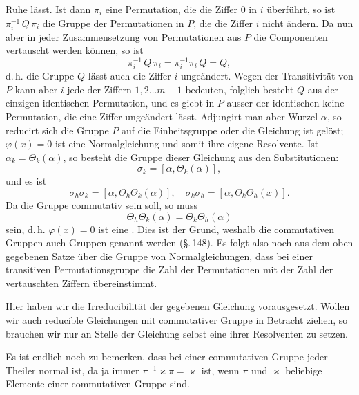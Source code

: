 Ruhe lässt. Ist dann $\pi_i$ eine Permutation, die die Ziffer 0 in $i$ überführt, so ist $\pi_i^{-1}\,Q\,\pi_i$ die Gruppe der Permutationen in $P$, die die Ziffer $i$ nicht ändern. Da nun aber in jeder Zusammensetzung von Permutationen aus $P$ die Componenten vertauscht werden können, so ist
\[
\pi_i^{-1}\,Q\,\pi_i = \pi_i^{-1}\pi_i\,Q = Q,
\]
d.\,h. die Gruppe $Q$ lässt auch die Ziffer $i$ ungeändert. Wegen der Transitivität von $P$ kann aber $i$ jede der Ziffern $1,2\ldots m-1$ bedeuten, folglich besteht $Q$ aus der einzigen identischen Permutation, und es giebt in $P$ ausser der identischen keine Permutation, die eine Ziffer ungeändert lässt. Adjungirt man aber  Wurzel $\alpha$, so reducirt sich die Gruppe $P$ auf die Einheitsgruppe oder die Gleichung ist gelöst; $\varphi(x)=0$ ist eine Normalgleichung und somit ihre eigene  Resolvente. Ist $\alpha_k=\Theta_k(\alpha)$, so besteht die  Gruppe dieser Gleichung aus den Substitutionen:
\[
\sigma_k = [\alpha,\Theta_k(\alpha)],
\]
und es ist
\[
\sigma_h\sigma_k = [\alpha,\Theta_h\Theta_k(\alpha)],\quad \sigma_k\sigma_h = [\alpha,\Theta_k\Theta_h(x)].
\]
Da die Gruppe commutativ sein soll, so muss
\[
\Theta_h\Theta_k(\alpha) = \Theta_k\Theta_h(\alpha)
\]
sein, d.\,h. $\varphi(x)=0$ ist eine . Dies ist der Grund, weshalb die commutativen Gruppen auch  Gruppen genannt werden (\S.\,148). Es folgt also noch aus dem oben gegebenen Satze über die Gruppe von Normalgleichungen, dass bei einer transitiven  Permutationsgruppe die Zahl der Permutationen mit der Zahl der vertauschten Ziffern übereinstimmt.

Hier haben wir die Irreducibilität der gegebenen Gleichung vorausgesetzt. Wollen wir auch reducible Gleichungen mit commutativer Gruppe in Betracht ziehen, so brauchen wir nur an Stelle der Gleichung selbst eine ihrer  Resolventen zu setzen.

Es ist endlich noch zu bemerken, dass bei einer commutativen Gruppe jeder Theiler normal ist, da ja immer $\pi^{-1}\varkappa\pi = \varkappa$ ist, wenn $\pi$ und $\varkappa$ beliebige Elemente einer commutativen Gruppe sind.
